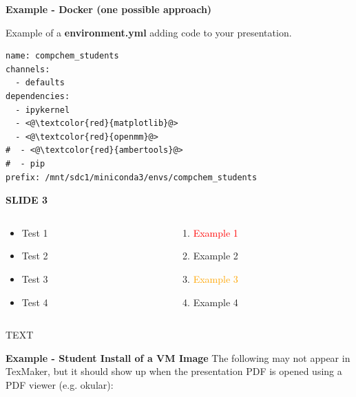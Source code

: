 \documentclass[11pt,vertical]{beamer}
\begin{document}
\begin{frame}[fragile]{\small \textbf{Example - Docker (one possible approach)}}
\small

\vfill
Example of a \textbf{\textcolor{HBRS}{environment.yml}} adding code to your presentation.
\begin{lstlisting}
name: compchem_students
channels:
  - defaults
dependencies:
  - ipykernel
  - <@\textcolor{red}{matplotlib}@>
  - <@\textcolor{red}{openmm}@>
#  - <@\textcolor{red}{ambertools}@>
#  - pip
prefix: /mnt/sdc1/miniconda3/envs/compchem_students
\end{lstlisting}
\end{frame}

\begin{frame}{\small \textbf{SLIDE 3}}
    \transfade
	\small
	\begin{columns}
	
		\begin{column}[t]{0.4\textwidth}
			\begin{itemize}
				\item Test 1
				\item Test 2
				\item Test 3
				\item Test 4
			\end{itemize}
		\end{column}
		
		\begin{column}[t]{0.4\textwidth}
			\begin{enumerate}
				\item \textcolor{red}{Example 1}
				\item \textcolor{HBRS}{Example 2}
				\item \textcolor{orange}{Example 3}
				\item Example 4
			\end{enumerate}
		\end{column}
		
	\end{columns}
	\vfill
	\lhline
	\LARGE
	TEXT
	\vfill


\end{frame}

\begin{frame}{\small \textbf{Example - Student Install of a VM Image}}
	\center
	The following may not appear in TexMaker, but it should show up when the presentation PDF is opened using a PDF viewer (e.g. okular):
	\vfill
\end{frame}
\end{document}
